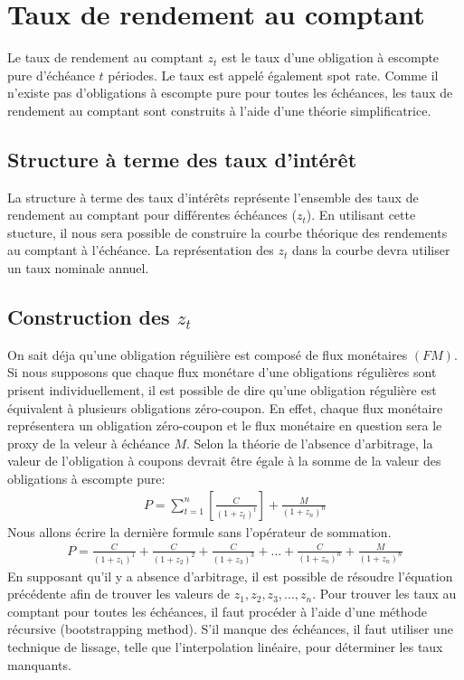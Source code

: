 \documentclass[12pt]{article}
\begin{document}
\section{Taux de rendement au comptant}
Le taux de rendement au comptant $z_t$ est le taux d’une obligation à escompte pure d’échéance $t$ périodes.  Le taux est appelé également spot rate.  Comme il n’existe pas d’obligations à escompte pure pour toutes les échéances,  les taux de rendement au comptant sont construits à l’aide d’une théorie simplificatrice.
\subsection{Structure à terme des taux d’intérêt}
La structure à terme des taux d'intérêts représente l'ensemble des taux de rendement au comptant pour différentes échéances ($z_t$).  En utilisant cette stucture,  il nous sera possible de construire la courbe théorique des rendements au comptant à l’échéance.  La représentation des $z_t$ dans la courbe devra utiliser un taux nominale annuel.
\newpage
\subsection{Construction des $z_t$}
On sait déja qu'une obligation réguilière est composé de flux monétaires $(FM)$.  Si nous supposons que chaque flux monétare d'une obligations régulières sont prisent individuellement,  il est possible de dire qu'une obligation régulière est équivalent à plusieurs obligations zéro-coupon. En effet,  chaque flux monétaire représentera un obligation zéro-coupon et le flux monétaire en question sera le proxy de la veleur à échéance $M$.  Selon la théorie de l’absence d’arbitrage, la valeur de l’obligation à coupons devrait être égale à la somme de la valeur des obligations à escompte pure:
\begin{align*}
P=\sum_{t=1}^n \left[ \frac{C}{(1+z_t)^t} \right]+\frac{M}{(1+z_n)^{n}}
\end{align*}
Nous allons écrire la dernière formule sans l'opérateur de sommation.
\begin{align*}
P=\frac{C}{(1+z_1)^1}+\frac{C}{(1+z_2)^2}+\frac{C}{(1+z_3)^3}+...+\frac{C}{(1+z_n)^n}+\frac{M}{(1+z_n)^{n}}
\end{align*}
En supposant qu’il y a absence d’arbitrage,  il est possible de résoudre l’équation précédente afin de trouver les valeurs de $z_1, z_2, z_3,...,z_n$.  Pour trouver les taux au comptant pour toutes les échéances,  il faut procéder à l’aide d’une méthode récursive (bootstrapping method).  S’il manque des échéances, il faut utiliser une technique de lissage, telle que l’interpolation linéaire, pour déterminer les taux manquants.
\end{document}
